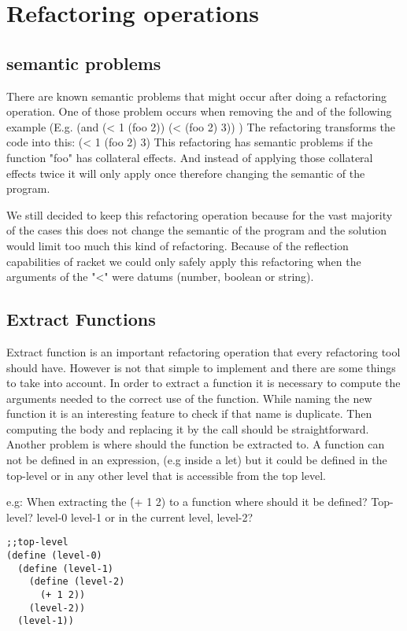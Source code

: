 \section{Refactoring operations}

\subsection{semantic problems}
There are known semantic problems that might occur after doing a refactoring
operation.
One of those problem occurs when removing the and of the following example
(E.g. (and (< 1 (foo 2)) (< (foo 2) 3)) )
The refactoring transforms the code into this:
(< 1 (foo 2) 3)
This refactoring has semantic problems if the function "foo" has collateral effects.
And instead of applying those collateral effects twice it will only apply once therefore
changing the semantic of the program.

We still decided to keep this refactoring operation because for the vast majority
of the cases this does not change the semantic of the program and the solution
would limit too much this kind of refactoring. Because of the reflection capabilities
of racket we could only safely apply this refactoring when the arguments of the
"<" were datums (number, boolean or string).

\subsection{Extract Functions}
Extract function is an important refactoring operation that every refactoring tool
should have. However is not that simple to implement and there are some things to
take into account.
In order to extract a function it is necessary to compute the arguments needed
to the correct use of the function. While naming the new function it is an interesting
feature to check if that name is duplicate.
Then computing the body and replacing it by the call should be straightforward.
Another problem is where should the function be extracted to. A function can not
be defined in an expression, (e.g inside a let) but it could be defined in the top-level
or in any other level that is accessible from the top level.

e.g: When extracting the \'(+ 1 2) to a function where should it be defined?
Top-level? level-0 level-1 or in the current level, level-2?
\begin{lstlisting}[caption="Example"]
;;top-level
(define (level-0)
  (define (level-1)
    (define (level-2)
      (+ 1 2))
    (level-2))
  (level-1))
\end{lstlisting}

